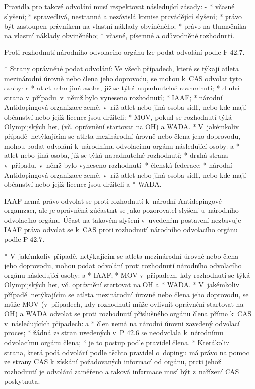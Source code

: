 Pravidla pro takové odvolání musí respektovat následující zásady:
  \begitems \style -
  * včasné slyšení;
  * spravedlivá, nestranná a nezávislá komise provádějící slyšení;
  * právo být zastoupen právníkem na vlastní náklady obviněného;
  * právo na tlumočníka na vlastní náklady obviněného;
  * včasné, písemné a odůvodněné rozhodnutí.
  \enditems

Proti rozhodnutí národního odvolacího orgánu lze podat odvolání podle P 42.7.

* Strany oprávněné podat odvolání: Ve všech případech, které se týkají atleta mezinárodní úrovně nebo člena jeho doprovodu, se mohou k~CAS odvolat tyto osoby:
  \begitems \style a
  * atlet nebo jiná osoba, jíž se týká napadnutelné rozhodnutí;
  * druhá strana v~případu, v~němž bylo vyneseno rozhodnutí;
  * IAAF;
  * národní Antidopingová organizace země, v~níž atlet nebo jiná osoba sídlí, nebo kde mají občanství nebo jejíž licence jsou držiteli;
  * MOV, pokud se rozhodnutí týká Olympijských her, (vč. oprávnění startovat na OH) a WADA.
  \enditems
* V~jakémkoliv případě, netýkajícím se atleta mezinárodní úrovně nebo člena jeho doprovodu, mohou podat odvolání k~národnímu odvolacímu orgánu následující osoby:
  \begitems \style a
  * atlet nebo jiná osoba, jíž se týká napadnutelné rozhodnutí;
  * druhá strana v~případu, v~němž bylo vyneseno rozhodnutí;
  * členská federace;
  * národní Antidopingová organizace země, v~níž atlet nebo jiná osoba sídlí, nebo kde mají občanství nebo jejíž licence jsou držiteli a
  * WADA.
  \enditems

IAAF nemá právo odvolat se proti rozhodnutí k~národní Antidopingové organizaci, ale je oprávněná zúčastnit se jako pozorovatel slyšení u~národního odvolacího orgánu. Účast na takovém slyšení v~uvedeném postavení nezbavuje IAAF práva odvolat se k~CAS proti rozhodnutí národního odvolacího orgánu podle P 42.7.

* V~jakémkoliv případě, netýkajícím se atleta mezinárodní úrovně nebo člena jeho doprovodu, mohou podat odvolání proti rozhodnutí národního odvolacího orgánu následující osoby:
  \begitems \style a
  * IAAF;
  * MOV v~případech, kdy rozhodnutí se týká Olympijských her, vč. oprávnění startovat na OH a
  * WADA.
  \enditems
* V~jakémkoliv případě, netýkajícím se atleta mezinárodní úrovně nebo člena jeho doprovodu, se může MOV (v~případech, kdy rozhodnutí může ovlivnit oprávnění startovat na OH) a WADA odvolat se proti rozhodnutí příslušného orgánu člena přímo k~CAS v~následujících případech:
 \begitems \style a
  * člen nemá na národní úrovni zavedený odvolací proces;
  * žádná ze stran uvedených v~P 42.6 se neodvolala k~národnímu odvolacímu orgánu člena;
  * je to postup podle pravidel člena.
  \enditems
* Kterákoliv strana, která podá odvolání podle těchto pravidel o~dopingu má právo na pomoc  ze strany CAS k~získání požadovaných informací od orgánu, proti jehož rozhodnutí je odvolání zaměřeno a taková informace musí být z~nařízení CAS poskytnuta.

